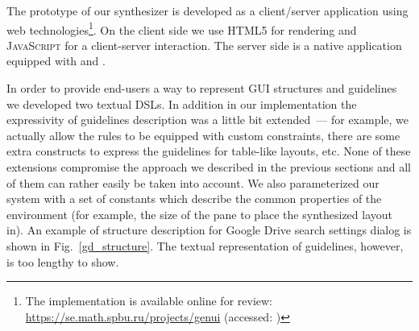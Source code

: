 
The prototype of our synthesizer is developed as a \mbox{client}/server application using web technologies\footnote{The implementation is available online
for review: \url{https://se.math.spbu.ru/projects/genui} (accessed: )}.
On the client side we use \textsc{HTML5} for rendering and \textsc{JavaScript} for a client-server interaction.
The server side is a native \OCaml{} application equipped with \OCanren{} and \Zthree{}.

In order to provide end-users a way to represent GUI structures and guidelines we developed two textual DSLs. In addition in our implementation
the expressivity of guidelines description was a little bit extended~--- for example, we actually allow the rules to be equipped with custom constraints, there are
some extra constructs to express the guidelines for table-like layouts, etc. None of these extensions compromise the approach we
described in the previous sections and all of them can rather easily be taken into account. We also parameterized our system with
a set of constants which describe the common properties of the environment (for example, the size of the pane to place the synthesized layout in).
An example of structure description for Google Drive search settings dialog is shown in Fig.~\ref{gd_structure}.
The textual representation of guidelines, however, is too lengthy to show.


